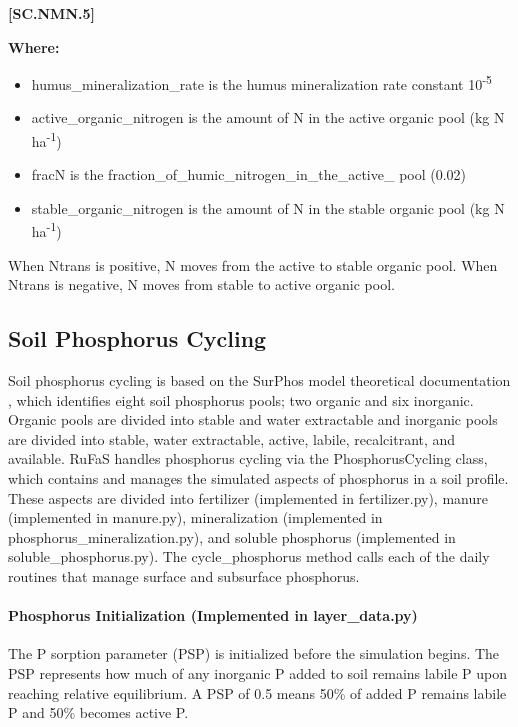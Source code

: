             {\raggedleft \textbf{[SC.NMN.5]}\par}
            \vspace{0.5cm}

        \textbf{Where:}
            
        \begin{itemize}
            \item humus\_mineralization\_rate is the humus mineralization rate constant 10\textsuperscript{-5}
            \item active\_organic\_nitrogen is the amount of N in the active organic pool (kg N ha\textsuperscript{-1})
            \item fracN is the fraction\_of\_humic\_nitrogen\_in\_the\_active\_ pool (0.02)
            \item stable\_organic\_nitrogen is the amount of N in the stable organic pool (kg N ha\textsuperscript{-1})  
        \end{itemize}
        \vspace{0.5cm}

When Ntrans is positive, N moves from the active to stable organic pool. When Ntrans is negative, N moves from stable to active organic pool.
\vspace{0.5cm}

\subsection{Soil Phosphorus Cycling}
\vspace{0.2cm}


Soil phosphorus cycling is based on the SurPhos model theoretical documentation \parencite{vadas2007}, which identifies eight soil phosphorus pools; two organic and six inorganic. Organic pools are divided into stable and water extractable and inorganic pools are divided into stable, water extractable, active, labile, recalcitrant, and available. RuFaS handles phosphorus cycling via the PhosphorusCycling class, which contains and manages the simulated aspects of phosphorus in a soil profile. These aspects are divided into fertilizer (implemented in fertilizer.py), manure (implemented in manure.py), mineralization (implemented in phosphorus\_mineralization.py), and soluble phosphorus (implemented in soluble\_phosphorus.py). The cycle\_phosphorus method calls each of the daily routines that manage surface and subsurface phosphorus.

\paragraph{Phosphorus Initialization (Implemented in layer\_data.py)}
The P sorption parameter (PSP) is initialized before the simulation begins. The PSP represents how much of any inorganic P added to soil remains labile P upon reaching relative equilibrium. A PSP of 0.5 means 50\% of added P remains labile P and 50\% becomes active P. 
\vspace{0.2cm}


